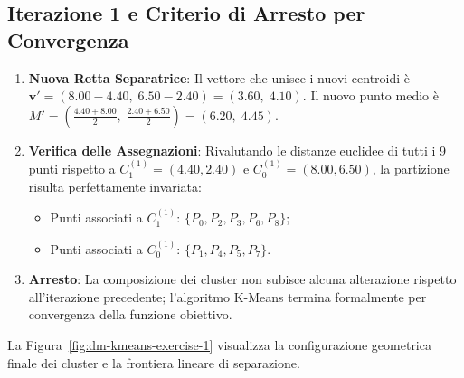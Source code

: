 \FloatBarrier
\subsection{Iterazione 1 e Criterio di Arresto per Convergenza}
\begin{enumerate}[label=\textbf{\arabic*.}]
    \item \textbf{Nuova Retta Separatrice}:
    Il vettore che unisce i nuovi centroidi è $\mathbf{v}' = (8.00 - 4.40, \; 6.50 - 2.40) = (3.60, \; 4.10)$.
    Il nuovo punto medio è $M' = \left(\frac{4.40 + 8.00}{2}, \; \frac{2.40 + 6.50}{2}\right) = (6.20, \; 4.45)$.
    \item \textbf{Verifica delle Assegnazioni}:
    Rivalutando le distanze euclidee di tutti i 9 punti rispetto a $C_1^{(1)} = (4.40, 2.40)$ e $C_0^{(1)} = (8.00, 6.50)$, la partizione risulta perfettamente invariata:
    \begin{itemize}
        \item Punti associati a $C_1^{(1)}$: $\{P_0, P_2, P_3, P_6, P_8\}$;
        \item Punti associati a $C_0^{(1)}$: $\{P_1, P_4, P_5, P_7\}$.
    \end{itemize}
    \item \textbf{Arresto}: La composizione dei cluster non subisce alcuna alterazione rispetto all'iterazione precedente; l'algoritmo K-Means termina formalmente per convergenza della funzione obiettivo.
\end{enumerate}

La Figura~\ref{fig:dm-kmeans-exercise-1} visualizza la configurazione geometrica finale dei cluster e la frontiera lineare di separazione.

